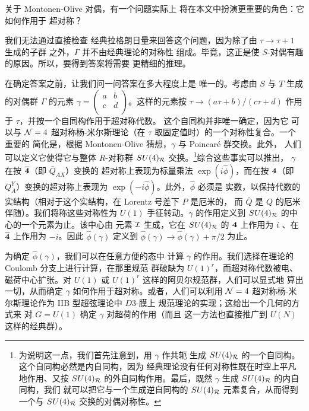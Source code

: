 \par{}

关于 Montonen-Olive 对偶，有一个问题实际上
将在本文中扮演更重要的角色：它如何作用于
超对称？

我们无法通过直接检查
经典拉格朗日量来回答这个问题，因为除了由 $\tau\to \tau+1$ 生成的子群
之外，$\Gamma$ 并不由经典理论的对称性
组成。毕竟，这正是使 $S$-对偶有趣的原因。所以，要得到答案将需要
更精细的推理。

在确定答案之前，让我们问一问答案在多大程度上是
唯一的。考虑由 $S$ 与 $T$ 生成的对偶群 $\Gamma$ 的元素 $\gamma=\left(\begin{matrix}a & b
\\ c & d \\\end{matrix}\right)$。这样的元素按 $\tau\to
(a\tau+b)/(c\tau+d)$ 作用于 $\tau$，并按一个自同构作用于超对称代数。
这个自同构并非唯一确定，因为它
可以与 ${\EUN}=4$ 超对称杨-米尔斯理论（在 $\tau$ 取固定值时）的一个对称性复合。一个重要的
简化是，根据 Montonen-Olive 猜想，$\gamma$ 与 Poincar\'e 群交换。此外，
人们可以定义它使得它与整体 $R$-对称群
$SU(4)_{{\cal R}}$ 交换。\footnote{为说明这一点，我们首先注意到，用 $\gamma$ 作共轭
生成 $SU(4)_{{\cal R}}$ 的一个自同构。这个自同构必然是内自同构，因为
经典理论没有任何对称性既在时空上平凡地作用、又按
$SU(4)_{{\cal R}}$ 的外自同构作用。最后，既然
$\gamma$ 生成 $SU(4)_{{\cal R}}$ 的内自同构，我们
就可以把它与一个生成逆自同构的 $SU(4)_{{\cal R}}$ 元素复合，从而得到
一个与 $SU(4)_{{\cal R}}$ 交换的对偶对称性。}综合这些事实可以推出，
$\gamma$ 在按 $\bar{\bf 4}$（即 $\bar Q_{AX}$）变换的
超对称上表现为标量乘法 $\exp(i\hat\phi)$，而在按
${\bf 4}$（即 $ Q_{\dot A}^Y$）变换的超对称上表现为 $\exp(-i\hat\phi)$。此外，$\hat\phi$ 必须是
实数，以保持代数的实结构（相对于这个实结构，在 Lorentz 号差下 $P$ 是厄米的，
而 $\bar Q$ 是 $Q$ 的厄米伴随）。我们将称这些对称性为
$U(1)$ 手征转动。$\gamma$ 的作用定义到
$SU(4)_{{\cal R}}$ 的中心的一个元素为止。该中心由
元素 ${\EUI}$ 生成，它在 $SU(4)_{{\cal R}}$ 的 ${\bf 4}$ 上作用为 $i$
、在 $\bf{ \bar 4}$ 上作用为 $-i$。因此
$\hat\phi(\gamma)$ 定义到
$\hat\phi(\gamma)\to\hat\phi(\gamma)+\pi/2$ 为止。

为确定 $\hat\phi(\gamma)$，我们可以在任意方便的态中
计算 $\gamma$ 的作用。我们选择在理论的 Coulomb 分支上进行计算，在那里规范
群破缺为 $U(1)^r$，而超对称代数被电、磁荷中心扩张。对
$U(1)$ 或 $U(1)^r$ 这样的阿贝尔规范群，人们可以显式地
算出一切，从而确定 $\gamma$ 如何作用于超对称。或者，人们可以利用
${\cal N}=4$ 超对称杨-米尔斯理论作为 IIB 型超弦理论中 $D3$-膜上
规范理论的实现；这给出一个几何的方式来
对 $G=U(1)$ 确定 $\gamma$ 对超荷的作用（而且
这一方法也直接推广到 $U(N)$ 这样的经典群）。


